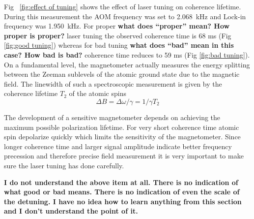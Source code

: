 \begin{itemize}
Fig~ \ref{fig:effect of tuning} shows the effect of laser tuning on
coherence lifetime. During this measurement the AOM frequency was set
to 2.068~kHz and Lock-in frequency was 1.950~kHz.  For proper {\bf
  what does ``proper'' mean?  How proper is proper?} 
  laser tuning the
observed coherence time is 68 ms (Fig \ref{fig:good tuning}) whereas
for bad tuning {\bf what does ``bad'' mean in this case?  How bad is
  bad?} %
  coherence time reduces to 59 ms (Fig \ref{fig:bad
  tuning}). On a fundamental level, the magnetometer actually measures
the energy splitting between the Zeeman sublevels of the atomic ground
state due to the magnetic field. The linewidth of such a spectroscopic
measurement is given by the coherence lifetime $T_2$ of the atomic
spins \cite{bib:Seltzer_thesis}
\begin{equation}
 \Delta B = \Delta\omega/\gamma  = 1/γ T_2
\end{equation}

The development of a sensitive magnetometer depends on achieving the
maximum possible polarization lifetime.  For very short coherence time
atomic spin depolarize quickly which limits the sensitivity of the
magnetometer.  Since longer coherence time and larger signal amplitude
indicate better frequency precession and therefore precise field
measurement it is very important to make sure the laser tuning has
done carefully.

{\bf I do not understand the above item at all.  There is no
  indication of what good or bad means.  There is no indication of
  even the scale of the detuning.  I have no idea how to learn
  anything from this section and I don't understand the point of it.}



\end{itemize}
